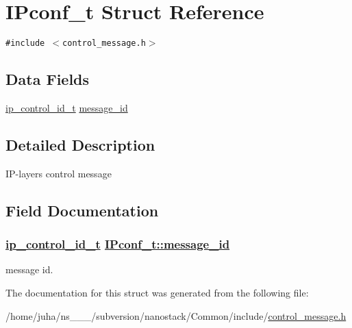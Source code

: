 \hypertarget{structIPconf__t}{
\section{IPconf\_\-t Struct Reference}
\label{structIPconf__t}
}
{\tt \#include $<$control\_\-message.h$>$}

\subsection*{Data Fields}
\begin{CompactItemize}
\item 
\hyperlink{control__message_8h_a517e422e7baca3bcf3f4676a7a70597}{ip\_\-control\_\-id\_\-t} \hyperlink{structIPconf__t_1cc2a0f7ff4c6bb6ad19af758d25e25a}{message\_\-id}
\end{CompactItemize}


\subsection{Detailed Description}
IP-layers control message 



\subsection{Field Documentation}
\hypertarget{structIPconf__t_1cc2a0f7ff4c6bb6ad19af758d25e25a}{
\subsubsection[message\_\-id]{\setlength{\rightskip}{0pt plus 5cm}\hyperlink{control__message_8h_a517e422e7baca3bcf3f4676a7a70597}{ip\_\-control\_\-id\_\-t} \hyperlink{structIPconf__t_1cc2a0f7ff4c6bb6ad19af758d25e25a}{IPconf\_\-t::message\_\-id}}}
\label{structIPconf__t_1cc2a0f7ff4c6bb6ad19af758d25e25a}


message id. 

The documentation for this struct was generated from the following file:\begin{CompactItemize}
\item 
/home/juha/ns\_\_\_/subversion/nanostack/Common/include/\hyperlink{control__message_8h}{control\_\-message.h}\end{CompactItemize}
